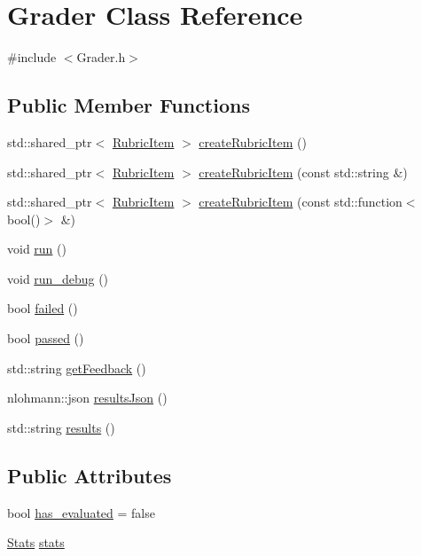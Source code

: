 \hypertarget{class_grader}{}\section{Grader Class Reference}
\label{class_grader}


{\ttfamily \#include $<$Grader.\+h$>$}

\subsection*{Public Member Functions}
\begin{DoxyCompactItemize}
\item 
std\+::shared\+\_\+ptr$<$ \hyperlink{class_rubric_item}{Rubric\+Item} $>$ \hyperlink{class_grader_a1fe6c647f25dcbe5559cd04832521358}{create\+Rubric\+Item} ()
\item 
std\+::shared\+\_\+ptr$<$ \hyperlink{class_rubric_item}{Rubric\+Item} $>$ \hyperlink{class_grader_a7867718932be3b027457c839d29b52b9}{create\+Rubric\+Item} (const std\+::string \&)
\item 
std\+::shared\+\_\+ptr$<$ \hyperlink{class_rubric_item}{Rubric\+Item} $>$ \hyperlink{class_grader_af367b7f22b6df92f3fd9575fad107d50}{create\+Rubric\+Item} (const std\+::function$<$ bool()$>$ \&)
\item 
void \hyperlink{class_grader_a1c0d301659e72b58cc5214663f580c85}{run} ()
\item 
void \hyperlink{class_grader_ac4cb9fc1094fea57d40c277f434d418d}{run\+\_\+debug} ()
\item 
bool \hyperlink{class_grader_acac97fc41ff9582c6bcb167f7537ee08}{failed} ()
\item 
bool \hyperlink{class_grader_a478a74aee440cdd28c9d8c67bcf3fde1}{passed} ()
\item 
std\+::string \hyperlink{class_grader_afb5d0bcb78bb58b3ffcad2cd77ef9610}{get\+Feedback} ()
\item 
nlohmann\+::json \hyperlink{class_grader_a0eb875277cac4c26fa67e5164caa3b38}{results\+Json} ()
\item 
std\+::string \hyperlink{class_grader_a11aecee1c8a72a7251906df8532259b1}{results} ()
\end{DoxyCompactItemize}
\subsection*{Public Attributes}
\begin{DoxyCompactItemize}
\item 
bool \hyperlink{class_grader_a88ad71fe69b966fa4faf4c77d4b09842}{has\+\_\+evaluated} = false
\item 
\hyperlink{class_stats}{Stats} \hyperlink{class_grader_aaa7a08227037ccd8b20d02d372fe567f}{stats}
\end{DoxyCompactItemize}


